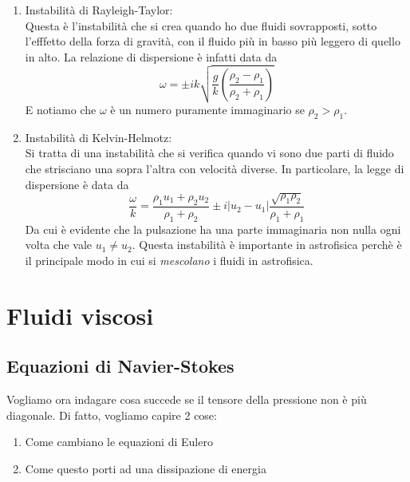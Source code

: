 \documentclass{report}
\begin{document}
\begin{enumerate}
    L'ultima espressione è particolarmente interessante, perchè ci ricordiamo che vale $S \propto p\rho^{-\gamma}$. Questo in particolare significa che se è presente un gradiente di entropia nella direzione opposta al campo gravitazionale, allora il fluido è instabile. Inoltre vuol dire che la convezione cerca di rendere il fluido isentropico. 
    \item Instabilità di Rayleigh-Taylor: \\
    Questa è l'instabilità che si crea quando ho due fluidi sovrapposti, sotto l'efffetto della forza di gravità, con il fluido più in basso più leggero di quello in alto. La relazione di dispersione è infatti data da 
    \begin{equation}
        \omega = \pm ik \sqrt{\frac{g}{k}\left(\frac{\rho_2 - \rho_1}{\rho_2 + \rho_1} \right)}
    \end{equation}
    E notiamo che $\omega$ è un numero puramente immaginario se $\rho_2 > \rho_1$. \\
    \item Instabilità di Kelvin-Helmotz: \\
    Si tratta di una instabilità che si verifica quando vi sono due parti di fluido che strisciano una sopra l'altra con velocità diverse. In particolare, la legge di dispersione è data da 
    \begin{equation}
        \frac{\omega}{k} = \frac{\rho_1u_1 + \rho_2u_2}{\rho_1 + \rho_2} \pm i |u_2 - u_1|\frac{\sqrt{\rho_1\rho_2}}{\rho_1 + \rho_1}
    \end{equation}
    Da cui è evidente che la pulsazione ha una parte immaginaria non nulla ogni volta che vale $u_1 \neq u_2$. Questa instabilità è importante in astrofisica perchè è il principale modo in cui si \emph{mescolano} i fluidi in astrofisica. 
\end{enumerate}

\newpage 
\chapter{Fluidi viscosi}
\section{Equazioni di Navier-Stokes}

Vogliamo ora indagare cosa succede se il tensore della pressione non è più diagonale. Di fatto,  vogliamo capire 2 cose: 
\begin{enumerate}
    \item Come cambiano le equazioni di Eulero 
    \item Come questo porti ad una dissipazione di energia
\end{enumerate}
\end{document}
